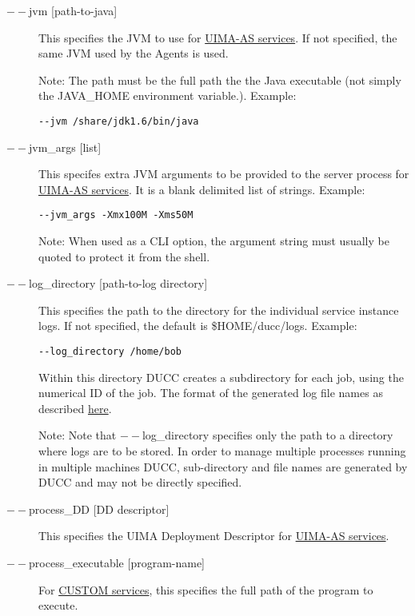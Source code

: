 \begin{description}
        \item[$--$jvm {[path-to-java]}] This specifies the JVM to use for 
          \hyperref[sec:services.types]{UIMA-AS services}. If not
          specified, the same JVM used by the Agents is used.  

          Note: The path must be the full path the the Java executable (not 
          simply the JAVA\_HOME environment variable.).  Example:
\begin{verbatim}
--jvm /share/jdk1.6/bin/java 
\end{verbatim}


        \item[$--$jvm\_args {[list]} ]        
          This specifes extra JVM arguments to be provided to the server process for
          \hyperref[sec:services.types]{UIMA-AS services}. It is a blank delimited 
            list of strings. Example: 
\begin{verbatim}
--jvm_args -Xmx100M -Xms50M
\end{verbatim}

          Note: When used as a CLI option, the argument string must usually be quoted to protect
          it from the shell.
    
          \item[$--$log\_directory {[path-to-log directory]}] This specifies the path to the directory for
            the individual service instance logs. If not specified, the default is \$HOME/ducc/logs. Example:
\begin{verbatim}
--log_directory /home/bob 
\end{verbatim}
        
        Within this directory DUCC creates a subdirectory for each job, using the numerical 
        ID of the job. The format of the generated log file names as described
        \hyperref[chap:job-logs]{here}.
        
        Note: Note that $--$log\_directory specifies only the path to a directory where 
        logs are to be stored. In order to manage multiple processes running in multiple 
        machines DUCC, sub-directory and file names are generated by DUCC and may 
        not be directly specified. 

      \item[$--$process\_DD {[DD descriptor]}] 
        This specifies the UIMA Deployment Descriptor for \hyperref[sec:services.types]{UIMA-AS services}.

      \item[$--$process\_executable {[program-name]}] For \hyperref[sec:services.types]{CUSTOM
          services}, this specifies the full path of the program to execute.


\end{description}
